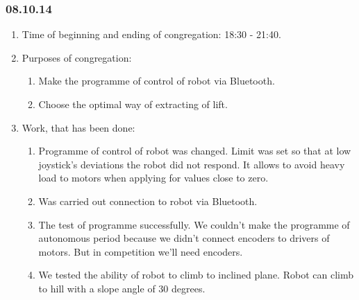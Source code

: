 
\subsubsection{08.10.14}

\begin{enumerate}
	\item Time of beginning and ending of congregation: 18:30 - 21:40.
	\item Purposes of congregation:
	\begin{enumerate}
	  \item Make the programme of control of robot via Bluetooth.
	  
	  \item Choose the optimal way of extracting of lift.
	  
    \end{enumerate}
	\item Work, that has been done:
	\begin{enumerate}
	  \item Programme of control of robot was changed. Limit was set so that at low joystick's deviations the robot did not respond. It allows to avoid heavy load to motors when applying for values close to zero.
      
      \item Was carried out connection to robot via Bluetooth.
      
      \item The test of programme successfully. We couldn't make the programme of autonomous period because we didn't connect encoders to drivers of motors. But in competition we'll need encoders.
      
      \item We tested the ability of robot to climb to inclined plane. Robot can climb to hill with a slope angle of 30 degrees.
       

\end{enumerate}
\end{enumerate}
